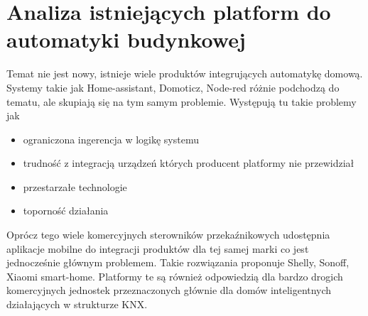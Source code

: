 \chapter{Analiza istniejących platform do automatyki budynkowej}
Temat nie jest nowy, istnieje wiele produktów integrujących automatykę domową. Systemy takie jak Home-assistant, Domoticz, Node-red różnie podchodzą do tematu, ale skupiają się na tym samym problemie. Występują tu takie problemy jak
\begin{itemize}
    \item ograniczona ingerencja w logikę systemu
    \item trudność z integracją urządzeń których producent platformy nie przewidział
    \item przestarzałe technologie
    \item toporność działania
\end{itemize}
Oprócz tego wiele komercyjnych sterowników przekaźnikowych udostępnia aplikacje mobilne do integracji produktów dla tej samej marki co jest jednocześnie głównym problemem. Takie rozwiązania proponuje Shelly, Sonoff, Xiaomi smart-home. Platformy te są również odpowiedzią dla bardzo drogich komercyjnych jednostek przeznaczonych  głównie dla domów inteligentnych działających w strukturze KNX.